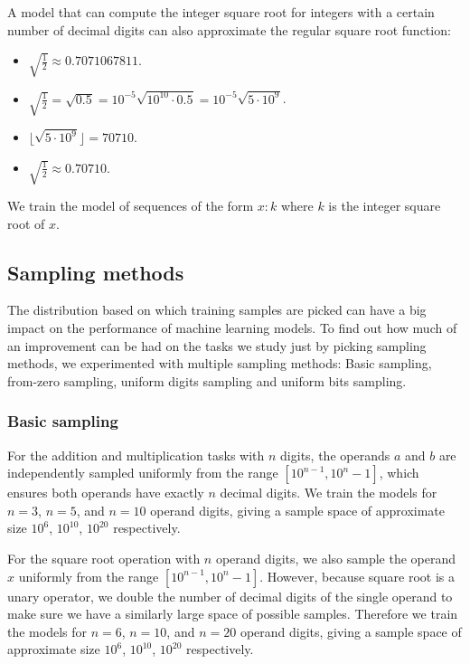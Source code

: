 A model that can compute the integer square root for integers with a certain number of decimal digits can also approximate the regular square root function:

\begin{itemize}
	\item $\sqrt{\frac{1}{2}} \approx 0.7071067811$.
	\item $\sqrt{\frac{1}{2}} = \sqrt{0.5} = 10^{-5} \sqrt{10^{10} \cdot 0.5}
	= 10^{-5} \sqrt{5 \cdot 10^9}$.
	\item $\lfloor \sqrt{5 \cdot 10^9} \rfloor = 70710$.
	\item $\sqrt{\frac{1}{2}} \approx 0.70710$.
\end{itemize}

We train the model of sequences of the form $x: k$ where $k$ is the integer square root of $x$.


\subsection{Sampling methods}
\label{methods:sampling}

The distribution based on which training samples are picked can have a big impact on the performance of machine learning models. To find out how much of an improvement can be had on the tasks we study just by picking sampling methods, we experimented with multiple sampling methods: Basic sampling, from-zero sampling, uniform digits  sampling and uniform bits sampling.

\subsubsection{Basic sampling}
\label{methods:sampling:basic}

For the addition and multiplication tasks with $n$ digits, the operands $a$ and $b$ are independently sampled uniformly from the range $[{10}^{n-1}, 10^n - 1]$, which ensures both operands have exactly $n$ decimal digits. We train the models for $n=3$, $n=5$,  and $n=10$ operand digits, giving a sample space of approximate size $10^6$, $10^{10}$, $10^{20}$ respectively.

For the square root operation with $n$ operand digits, we also sample the operand $x$ uniformly from the range $[{10}^{n-1}, 10^n - 1]$. However, because square root is a unary operator, we double the number of decimal digits of the single operand to make sure we have a similarly large space of possible samples. Therefore we train the models for $n=6$, $n=10$,  and $n=20$ operand digits, giving a sample space of approximate size $10^6$, $10^{10}$, $10^{20}$ respectively.

